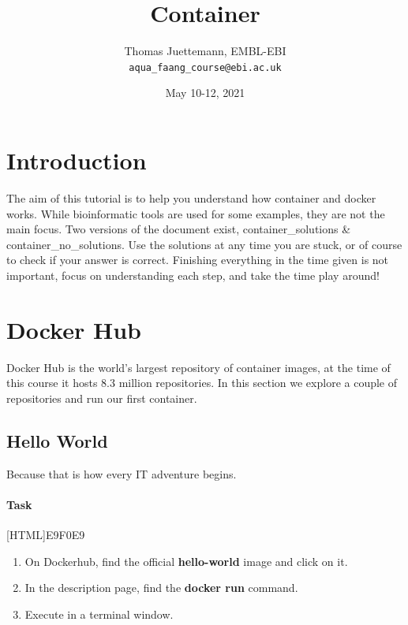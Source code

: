 \documentclass[12pt]{article}
\begin{document}
	
	\title{Container} 
	\author{Thomas Juettemann, EMBL-EBI\\
	\texttt{aqua\_faang\_course@ebi.ac.uk}}  %
	\date{May 10-12, 2021}  %
	\maketitle
	

	\section{Introduction}
		The aim of this tutorial is to help you understand how container and docker works.
		While bioinformatic tools are used for some examples, they are not the main focus.
		Two versions of the document exist, container\_solutions \& container\_no\_solutions.
		Use the solutions at any time you are stuck, or of course to check if your answer is correct.
		Finishing everything in the time given is not important, focus on understanding each step,  and take the time play around! 
		
	
	
	\section{Docker Hub}
		Docker Hub is the world’s largest repository of container images, at the time of this course it hosts 8.3 million repositories. 
		In this section we explore a couple of repositories and run our first container.
	
		\subsection{Hello World}
			Because that is how every IT adventure begins.
			
			
			\paragraph{Task}
				[HTML]{E9F0E9}{\parbox{\linewidth}{%
						\begin{enumerate}
							\item On Dockerhub, find the official  \textbf{hello-world} image and click on it.
							\item In the description page, find the \textbf{docker run } command.
							\item Execute  in a terminal window.
						\end{enumerate}
				}}
			
\end{document}
